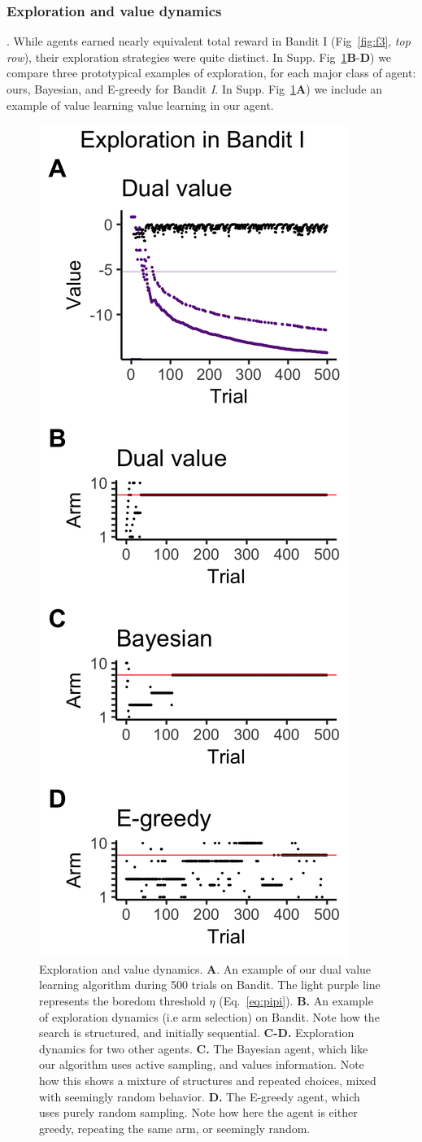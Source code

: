\subsubsection*{Exploration and value dynamics}. 
While agents earned nearly equivalent total reward in Bandit I (Fig~\ref{fig:f3}, \textit{top row}), their exploration strategies were quite distinct. In Supp. Fig~\ref{fig:supf3}\textbf{B}-\textbf{D}) we compare three prototypical examples of exploration, for each major class of agent: ours, Bayesian, and E-greedy for Bandit \textit{I}. In Supp. Fig~\ref{fig:supf3}\textbf{A}) we include an example of value learning value learning in our agent.

\begin{figure}
	[tbhp] \centering 
	\includegraphics[width=.5\linewidth]{figures/subfig3.png} 
	\caption{\label{fig:supf3} Exploration and value dynamics.
	\textbf{A}. An example of our dual value learning algorithm during 500 trials on Bandit. The light purple line represents the boredom threshold $\eta$ (Eq.~\ref{eq:pipi}).
	\textbf{B.} An example of exploration dynamics (i.e arm selection) on Bandit. Note how the search is structured, and initially sequential.  
	\textbf{C-D.} Exploration dynamics for two other agents. \textbf{C.} The Bayesian agent, which like our algorithm uses active sampling, and values information. Note how this shows a mixture of structures and repeated choices, mixed with seemingly random behavior. \textbf{D.} The E-greedy agent, which uses purely random sampling. Note how here the agent is either greedy, repeating the same arm, or seemingly random.}
\end{figure}
